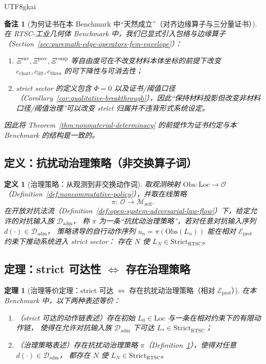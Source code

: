 \documentclass[12pt]{article}
\newtheorem{definition}{定义}[section]
\newtheorem{theorem}{定理}[section]
\newtheorem{remark}{备注}[section]
\newcommand{\RTSC}{\textsf{RTSC}}
\begin{document}
\begin{CJK*}{UTF8}{gkai}
\begin{remark}[为何证书在本 Benchmark 中“天然成立”（对齐边缘算子与三分量证书）]
在 \RTSC{}-工业几何体 Benchmark 中，我们已显式引入包络与边缘算子（Section~\ref{sec:puremath-edge-operators-fem-envelope}）：
\begin{enumerate}
  \item $\Xi^{\mathrm{env}},\Xi^{\mathrm{prec}},\Xi^{\mathrm{comp}}$ 等自由度可在\emph{不改变}材料本体坐标的前提下改变
  $c_{\mathrm{chart}},c_{\mathrm{lift}},c_{\mathrm{thres}}$ 的可下降性与可消去性；
  \item strict sector 的定义包含 $\Phi=0$ 以及证书/阈值口径（Corollary~\ref{cor:qualitative-breakthrough}），因此“保持材料投影但改变非材料口径/阈值治理”可以改变
    strict 归属并不违背形式系统设定。
\end{enumerate}
因此将 Theorem~\ref{thm:nonmaterial-determinacy} 的前提作为证书约定与本 Benchmark 的结构是一致的。
\end{remark}

\subsection{定义：抗扰动治理策略（非交换算子词）}

\begin{definition}[治理策略：从观测到非交换动作词]
\label{def:governance-policy}
取观测映射 $\mathrm{Obs}:\mathrm{Loc}\to\mathcal{O}$（Definition~\ref{def:noncommutative-policy}），并取在线策略
\[
\pi:\ \mathcal{O}\to \mathcal{M}_{\mathrm{self}}.
\]
在开放对抗法流（Definition~\ref{def:open-system-adversarial-law-flow}）下，给定允许的对抗输入族 $\mathcal{D}_{\mathrm{adm}}$，
称 $\pi$ 为一条“抗扰动治理策略”，若对任意对抗输入序列 $d(\cdot)\in\mathcal{D}_{\mathrm{adm}}$，
策略诱导的自行动作序列 $u_n=\pi(\mathrm{Obs}(L_n))$ 能在相对 $\mathcal{E}_{\mathrm{prot}}$ 约束下推动系统进入 strict sector：
存在 $N$ 使 $L_N\in \mathrm{Strict}_{\mathrm{RTSC}}$。
\end{definition}

\subsection{定理：strict 可达性 $\Longleftrightarrow$ 存在治理策略}

\begin{theorem}[治理等价定理：strict 可达 $\Longleftrightarrow$ 存在抗扰动治理策略（相对 $\mathcal{E}_{\mathrm{prot}}$）]
\label{thm:governance-equivalence}
在本 Benchmark 中，以下两种表述等价：
\begin{enumerate}
  \item（strict 可达的动作链表述）存在初始 $L_0\in\mathrm{Loc}$ 与一条在相对约束下的有限动作链，
  使得在允许对抗输入族 $\mathcal{D}_{\mathrm{adm}}$ 下可达 $L_\ast\in \mathrm{Strict}_{\mathrm{RTSC}}$；
  \item（治理策略表述）存在抗扰动治理策略 $\pi$（Definition~\ref{def:governance-policy}），使得对任意 $d(\cdot)\in\mathcal{D}_{\mathrm{adm}}$，
  都存在 $N$ 使 $L_N\in \mathrm{Strict}_{\mathrm{RTSC}}$。
\end{enumerate}
\end{theorem}


\end{CJK*}
\end{document}
